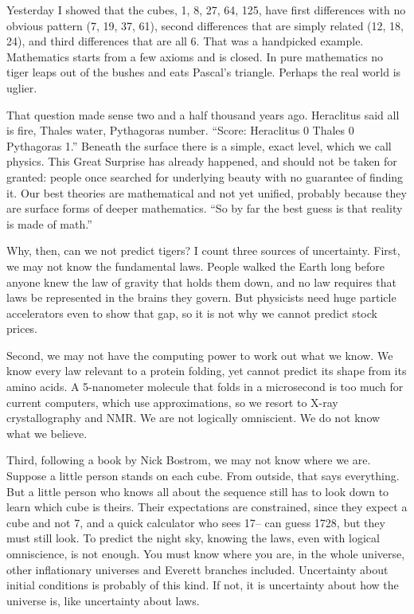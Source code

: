 
Yesterday I showed that the cubes, 1, 8, 27, 64, 125, have first differences with no obvious pattern (7, 19, 37, 61), second differences that are simply related (12, 18, 24), and third differences that are all 6. That was a handpicked example. Mathematics starts from a few axioms and is closed. In pure mathematics no tiger leaps out of the bushes and eats Pascal's triangle. Perhaps the real world is uglier. 

That question made sense two and a half thousand years ago. Heraclitus said all is fire, Thales water, Pythagoras number. ``Score: Heraclitus 0 Thales 0 Pythagoras 1.'' Beneath the surface there is a simple, exact level, which we call physics. This Great Surprise has already happened, and should not be taken for granted: people once searched for underlying beauty with no guarantee of finding it. Our best theories are mathematical and not yet unified, probably because they are surface forms of deeper mathematics. ``So by far the best guess is that reality is made of math.'' 

Why, then, can we not predict tigers? I count three sources of uncertainty. First, we may not know the fundamental laws. People walked the Earth long before anyone knew the law of gravity that holds them down, and no law requires that laws be represented in the brains they govern. But physicists need huge particle accelerators even to show that gap, so it is not why we cannot predict stock prices.

Second, we may not have the computing power to work out what we know. We know every law relevant to a protein folding, yet cannot predict its shape from its amino acids. A 5-nanometer molecule that folds in a microsecond is too much for current computers, which use approximations, so we resort to X-ray crystallography and NMR. We are not logically omniscient. We do not know what we believe. 

Third, following a book by Nick Bostrom, we may not know where we are. Suppose a little person stands on each cube. From outside, that says everything. But a little person who knows all about the sequence still has to look down to learn which cube is theirs. Their expectations are constrained, since they expect a cube and not 7, and a quick calculator who sees 17-- can guess 1728, but they must still look. To predict the night sky, knowing the laws, even with logical omniscience, is not enough. You must know where you are, in the whole universe, other inflationary universes and Everett branches included. Uncertainty about initial conditions is probably of this kind. If not, it is uncertainty about how the universe is, like uncertainty about laws. 

